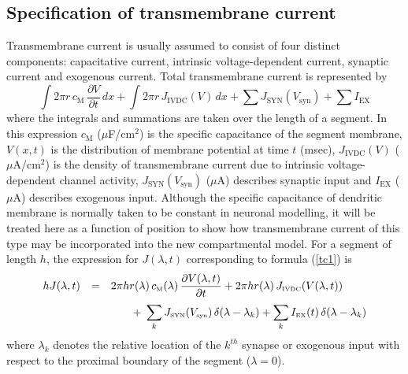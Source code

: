 \subsection{Specification of transmembrane current}
Transmembrane current is usually assumed to consist of four
distinct components: capacitative current, intrinsic
voltage-dependent current, synaptic current and exogenous current.
Total transmembrane current is represented by
\begin{equation}\label{tc1}
\int 2\pi r \,c_\mathrm{M}\,\frac{\partial V}{\partial t}\,dx
+\int 2\pi r\,J_\mathrm{IVDC}(V)\,dx+\sum
J_\mathrm{SYN}(V_\mathrm{syn}) +\sum I_\mathrm{EX}
\end{equation}
where the integrals and summations are taken over the length of a
segment. In this expression $c_\mathrm{M}$ ($\mu$F/cm$^2$) is the
specific capacitance of the segment membrane, $V(x,t)$ is the
distribution of membrane potential at time $t$ (msec),
$J_\mathrm{IVDC}(V)$ ($\mu$A/cm$^2$) is the density of
transmembrane current due to intrinsic voltage-dependent channel
activity, $J_\mathrm{SYN}(V_\mathrm{syn})$ ($\mu$A) describes
synaptic input and $I_\mathrm{EX}$ ($\mu$A) describes exogenous
input. Although the specific capacitance of dendritic membrane is
normally taken to be constant in neuronal modelling, it will be
treated here as a function of position to show how transmembrane
current of this type may be incorporated into the new
compartmental model. For a segment of length $h$, the expression
for $J(\lambda,t)$ corresponding to formula (\ref{tc1}) is
\begin{equation}\label{tc2}
\begin{array}{rcl}
h J(\lambda,t) & = & \displaystyle2\pi h
r(\lambda)\,c_{\mbox{\tiny M}}(\lambda)\,\frac{\partial
V(\lambda,t)}{\partial t}+2\pi h r(\lambda)\,J_{\mbox{\tiny IVDC}}(V(\lambda,t))\\[10pt]
&&\qquad \displaystyle+\;\sum_k
J_{\mbox{\tiny SYN}}(V_{\mbox{\tiny syn}})\,\delta(\lambda-\lambda_k) + \sum_k
I_{\mbox{\tiny EX}}(t)\,\delta(\lambda-\lambda_k)
\end{array}
\end{equation}
where $\lambda_k$ denotes the relative location of the $k^{th}$
synapse or exogenous input with respect to the proximal boundary
of the segment ($\lambda=0$).
